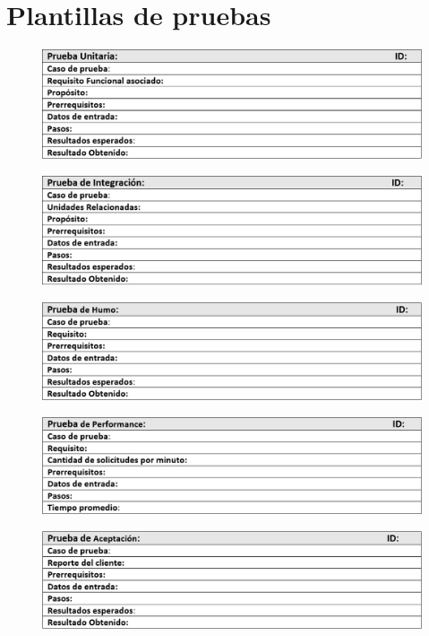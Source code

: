 \section{Plantillas de pruebas}

\begin{figure}[H]
\centering
\includegraphics[width=1\textwidth]{figures/anexos/6-2-1-2.PNG}
\end{figure}

\begin{figure}[H]
\centering
\includegraphics[width=1\textwidth]{figures/anexos/6-2-2-2.PNG}
\end{figure}

\begin{figure}[H]
\centering
\includegraphics[width=1\textwidth]{figures/anexos/6-2-3-1a.PNG}
\end{figure}

\begin{figure}[H]
\centering
\includegraphics[width=1\textwidth]{figures/anexos/6-2-3-1b.PNG}
\end{figure}

\begin{figure}[H]
\centering
\includegraphics[width=1\textwidth]{figures/anexos/6-2-4-1.PNG}
\end{figure}